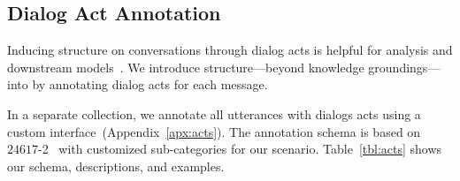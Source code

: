 \subsection{Dialog Act Annotation}
\label{sec:da}

Inducing structure on conversations through dialog acts is helpful for analysis and downstream models~\citep{tanaka-etal-2019-dialogue}.
We introduce structure---beyond knowledge groundings---into \rover{} by annotating dialog acts for each message.

In a separate collection, we annotate all utterances with dialogs acts using a custom interface~(Appendix~\ref{apx:acts}).
The annotation schema is based on  $24617$-2~\citep{Bunt2010TowardsAI,Bunt2012ISO2A} with customized sub-categories for our scenario.
Table~\ref{tbl:acts} shows our schema, descriptions, and examples.

